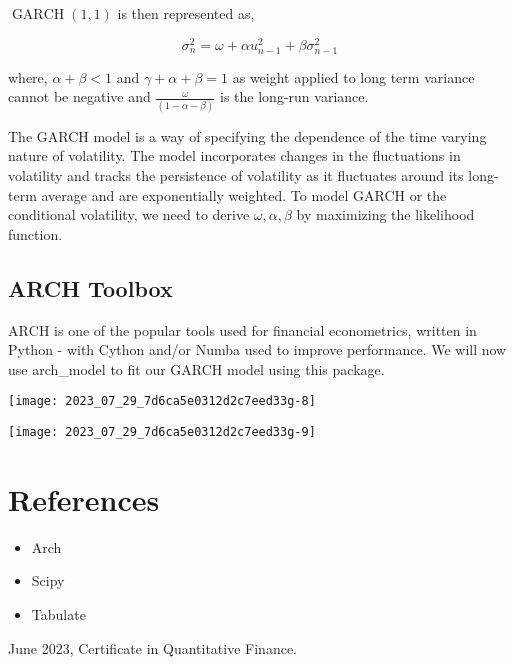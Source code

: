 \documentclass[10pt]{article}
\begin{document}
$\operatorname{GARCH}(1,1)$ is then represented as,

$$
\sigma_{n}^{2}=\omega+\alpha u_{n-1}^{2}+\beta \sigma_{n-1}^{2}
$$

where, $\alpha+\beta<1$ and $\gamma+\alpha+\beta=1$ as weight applied to long term variance cannot be negative and $\frac{\omega}{(1-\alpha-\beta)}$ is the long-run variance.

The GARCH model is a way of specifying the dependence of the time varying nature of volatility. The model incorporates changes in the fluctuations in volatility and tracks the persistence of volatility as it fluctuates around its long-term average and are exponentially weighted. To model GARCH or the conditional volatility, we need to derive $\omega, \alpha, \beta$ by maximizing the likelihood function.

\subsection*{ARCH Toolbox}
$\mathrm{ARCH}$ is one of the popular tools used for financial econometrics, written in Python - with Cython and/or Numba used to improve performance. We will now use arch\_model to fit our GARCH model using this package.

\begin{center}
\texttt{[image: 2023\_07\_29\_7d6ca5e0312d2c7eed33g-8]}
\end{center}

\begin{center}
\texttt{[image: 2023\_07\_29\_7d6ca5e0312d2c7eed33g-9]}
\end{center}

\section*{References}
\begin{itemize}
  \item Arch

  \item Scipy

  \item Tabulate

\end{itemize}

June 2023, Certificate in Quantitative Finance.
\end{document}
